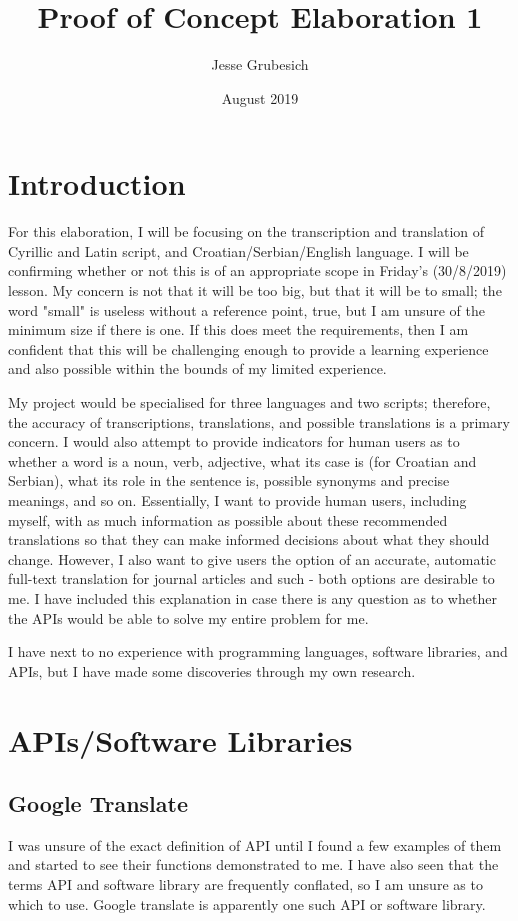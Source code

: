 \documentclass{article}
\title{Proof of Concept Elaboration 1}
\author{Jesse Grubesich}
\date{August 2019}
\begin{document}
\maketitle

\section{Introduction}
For this elaboration, I will be focusing on the transcription and translation of Cyrillic and Latin script, and Croatian/Serbian/English language. I will be confirming whether or not this is of an appropriate scope in Friday's (30/8/2019) lesson. My concern is not that it will be too big, but that it will be to small; the word "small" is useless without a reference point, true, but I am unsure of the minimum size if there is one. If this does meet the requirements, then I am confident that this will be challenging enough to provide a learning experience and also possible within the bounds of my limited experience.

My project would be specialised for three languages and two scripts; therefore, the accuracy of transcriptions, translations, and possible translations is a primary concern. I would also attempt to provide indicators for human users as to whether a word is a noun, verb, adjective, what its case is (for Croatian and Serbian), what its role in the sentence is, possible synonyms and precise meanings, and so on. Essentially, I want to provide human users, including myself, with as much information as possible about these recommended translations so that they can make informed decisions about what they should change. However, I also want to give users the option of an accurate, automatic full-text translation for journal articles and such - both options are desirable to me. I have included this explanation in case there is any question as to whether the APIs would be able to solve my entire problem for me.

I have next to no experience with programming languages, software libraries, and APIs, but I have made some discoveries through my own research.

\section{APIs/Software Libraries}
\subsection{Google Translate}
I was unsure of the exact definition of API until I found a few examples of them and started to see their functions demonstrated to me. I have also seen that the terms API and software library are frequently conflated, so I am unsure as to which to use. Google translate is apparently one such API or software library.
\end{document}
